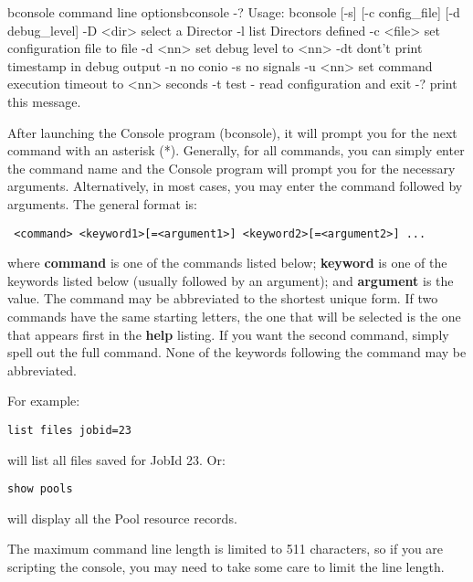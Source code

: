 \begin{commandOut}{bconsole command line options}{}{bconsole -?}
Usage: bconsole [-s] [-c config_file] [-d debug_level]
       -D <dir>    select a Director
       -l          list Directors defined
       -c <file>   set configuration file to file
       -d <nn>     set debug level to <nn>
       -dt         dont't print timestamp in debug output
       -n          no conio
       -s          no signals
       -u <nn>     set command execution timeout to <nn> seconds
       -t          test - read configuration and exit
       -?          print this message.
\end{commandOut}


After launching the Console program (bconsole), it will prompt you for the next
command with an asterisk (*).  Generally, for all commands, you can simply
enter the command name and the Console program will prompt you for the
necessary arguments. Alternatively, in most cases, you may enter the command
followed by arguments. The general format is:

\footnotesize
\begin{verbatim}
 <command> <keyword1>[=<argument1>] <keyword2>[=<argument2>] ...
\end{verbatim}
\normalsize

where {\bf command} is one of the commands listed below; {\bf keyword} is one
of the keywords listed below (usually followed by an argument); and {\bf
argument} is the value. The command may be abbreviated to the shortest unique
form. If two commands have the same starting letters, the one that will be
selected is the one that appears first in the {\bf help} listing. If you want
the second command, simply spell out the full command. None of the keywords
following the command may be abbreviated.

For example:

\footnotesize
\begin{verbatim}
list files jobid=23
\end{verbatim}
\normalsize

will list all files saved for JobId 23. Or:

\footnotesize
\begin{verbatim}
show pools
\end{verbatim}
\normalsize

will display all the Pool resource records.

The maximum command line length is limited to 511 characters, so if you
are scripting the console, you may need to take some care to limit the
line length.

